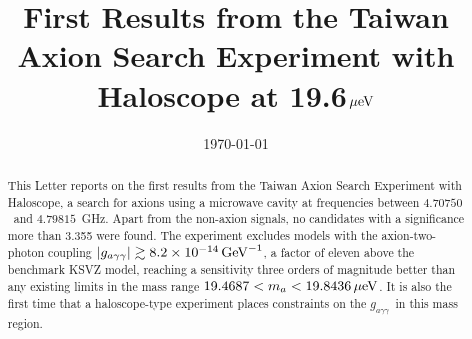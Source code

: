 \documentclass[%
 reprint,prl, %
superscriptaddress,
nobibnotes,
 amsmath,amssymb,
 aps,
]{revtex4-2}
\newcommand{\gagg}{\ensuremath{\left|g_{a\gamma\gamma}\right|}}
\newcommand{\bgagg}{\ensuremath{g_{a\gamma\gamma}}}
\newcommand{\ma}{\ensuremath{m_a}}
\newcommand{\muevcc}{\ensuremath{\,\mu\text{e\hspace{-.08em}V}}}
\newcommand{\GeVinv}{\ensuremath{\,\text{Ge\hspace{-.08em}V}^{-1}}}
\newcommand{\flo}{\ensuremath{4.70750}}
\newcommand{\fhi}{\ensuremath{4.79815}}
\newcommand{\mlo}{\ensuremath{19.4687}}
\newcommand{\mhi}{\ensuremath{19.8436}}
\newcommand{\avelimit}{\ensuremath{8.2\times 10^{-14}}} %
\begin{document}

\title{First Results from the Taiwan Axion Search Experiment with Haloscope at 19.6\muevcc}%



\date{\today}%

\begin{abstract}

 This Letter reports on the first results from the 
Taiwan Axion Search Experiment with Haloscope, a search for axions 
using a microwave cavity at frequencies between \flo\ and \fhi~GHz. 
Apart from the non-axion signals, no candidates with 
a significance more than 3.355 were found. The experiment excludes 
models with the axion-two-photon coupling $\gagg\gtrsim \avelimit\GeVinv$, 
a factor of eleven above the benchmark 
KSVZ model, reaching 
a sensitivity three orders of magnitude better than any existing limits 
 in the mass range $\mlo < \ma < \mhi \muevcc$.  
 It is also the first time that a haloscope-type experiment places 
constraints on the \bgagg\ in this mass region.


\end{abstract}

\maketitle
\end{document}
